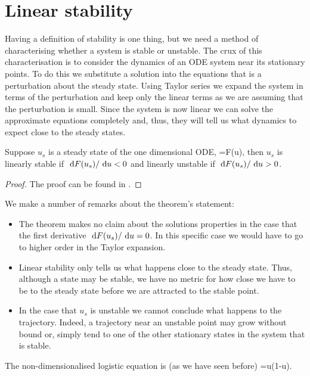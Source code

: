 \section{Linear stability}
Having a definition of stability is one thing, but we need a method of characterising whether a system is stable or unstable. The crux of this characterisation is to consider the dynamics of an ODE system near its stationary points. To do this we substitute a solution into the equations that is a perturbation about the steady state. Using Taylor series we expand the system in terms of the perturbation and keep only the linear terms as we are assuming that the perturbation is small. Since the system is now linear we can solve the approximate equations completely and, thus, they will tell us what dynamics to expect close to the steady states.
\begin{thm}\label{Stability_theorem}
Suppose $u_s$ is a steady state of the one dimensional ODE,
\bb
{}=F(u),\label{General_ODE}
\ee
then $u_s$ is linearly stable if $\text{ d} F(u_s)/\text{ d} u<0$ and linearly unstable if $\text{ d} F(u_s)/\text{ d} u>0$.
\end{thm}
\begin{proof}
The proof can be found in .
\end{proof}
We make a number of remarks about the theorem's statement:
\begin{itemize}
\item The theorem makes no claim about the solutions properties in the case that the first derivative $\text{ d} F(u_s)/\text{ d} u=0$. In this specific case we would have to go to higher order in the Taylor expansion.
\item Linear stability only tells us what happens close to the steady state. Thus, although a state may be stable, we have no metric for how close we have to be to the steady state before we are attracted to the stable point.
\item In the case that $u_s$ is unstable we cannot conclude what happens to the trajectory. Indeed, a trajectory near an unstable point may grow without bound or, simply tend to one of the other stationary states in the system that is stable.
\end{itemize}
\begin{example}[frametitle=Stationary states and stability of the logistic equation\label{Logistic_stability_example}]
The non-dimensionalised logistic equation is (as we have seen before)
\bb
{}=u(1-u).\label{Logistic_stability}
\ee
{}
\end{example}
